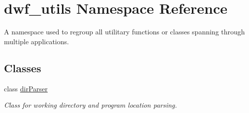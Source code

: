 \hypertarget{namespacedwf__utils}{\section{dwf\-\_\-utils \-Namespace \-Reference}
\label{namespacedwf__utils}
}


\-A namespace used to regroup all utilitary functions or classes spanning through multiple applications.  


\subsection*{\-Classes}
\begin{DoxyCompactItemize}
\item 
class \hyperlink{classdwf__utils_1_1dir_parser}{dir\-Parser}
\begin{DoxyCompactList}\small\item\em \-Class for working directory and program location parsing. \end{DoxyCompactList}\end{DoxyCompactItemize}
